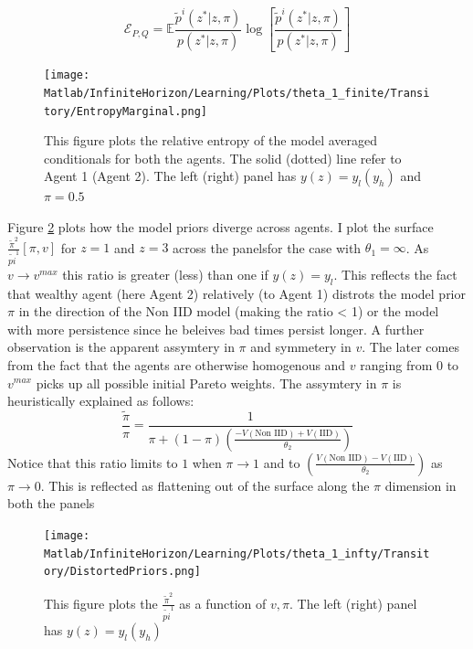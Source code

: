 \documentclass[12pt]{article}
\begin{document}
{\[\mathcal{E}_{P,Q} =  \mathbb{E} \frac{\tilde{p}^i(z^*|z,\pi)}{p(z^*|z,\pi)} \log\left[\frac{\tilde{p}^i(z^*|z,\pi)}{p(z^*|z,\pi)}\right]\]}
\begin{figure}[htbp]
\centering
	  \texttt{[image: Matlab/InfiniteHorizon/Learning/Plots/theta\_1\_finite/Transitory/EntropyMarginal.png]}

	\caption{\small{This figure plots the relative entropy of the model averaged
 conditionals for both the agents. The solid (dotted) line refer to Agent 1 (Agent 2). The left (right) panel has $y(z)=y_l (y_h)$ and $\pi=0.5$ }}
 
	\label{fig:EntropyMarginal}
\end{figure} 

\noindent Figure \ref{fig:DistPriors} plots how the model priors diverge across agents. I plot the surface $\frac{\tilde{\pi}^2}{\tilde{pi}^1}[\pi,v]$ for $z=1$ and $z=3$ across the panelsfor the case with $\theta_1=\infty$.  As $v\to v^{max}$ this ratio is greater (less) than one if $y(z)=y_l$. This reflects the fact that wealthy agent (here Agent 2) relatively (to Agent 1) distrots the model prior $\pi$ in the direction of the Non IID model (making the ratio < 1) or the model with more persistence since he beleives bad times persist longer. A further observation is the apparent assymtery in $\pi$ and symmetery in $v$. The later comes from the fact that the agents are otherwise homogenous and $v$ ranging from $0$ to $v^{max}$ picks up all possible initial Pareto weights. The assymtery in $\pi$ is heuristically explained as follows:
\[\frac{\tilde{\pi} }{\pi} = \frac{1}{\pi+(1-\pi) \left(\frac{-V(\text{Non IID}) + V(\text{IID})}{\theta_2}\right)}\]
Notice that this ratio limits to $1$ when $\pi \to 1$ and to $\left(\frac{V(\text{Non IID}) - V(\text{IID})}{\theta_2}\right)$ as $\pi \to 0$. This is reflected as flattening out of the surface along the $\pi$ dimension in both the panels
\begin{figure}[htbp]
\centering
	  \texttt{[image: Matlab/InfiniteHorizon/Learning/Plots/theta\_1\_infty/Transitory/DistortedPriors.png]}

	\caption{This figure plots the $\frac{\tilde{\pi}^2}{\tilde{pi}^1}$ as a function of $v,\pi$. The left (right) panel has $y(z)=y_l (y_h)$ }
 
	\label{fig:DistPriors}
\end{figure} 
\end{document}
